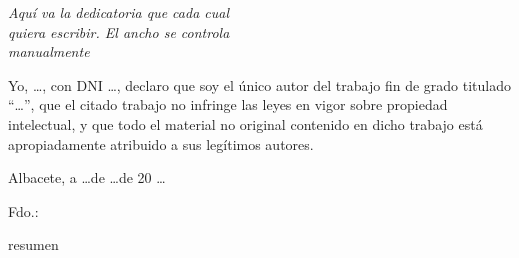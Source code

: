 %
% 



\clearpage
\thispagestyle{empty}

\vspace*{9cm}  
\begin{flushright} \em 
Aquí va la dedicatoria que cada cual \\ 
quiera escribir. El ancho se controla \\ 
manualmente
\end{flushright}


\clearpage
\thispagestyle{plain}
\setcounter{page}{1} \null
\begin{center}
\Large{}
\end{center}
\vskip1cm

Yo, \quad \ldots \quad, con DNI \quad \ldots \quad, declaro que soy el único autor del trabajo fin de grado titulado ``\quad \ldots \quad'', que el citado trabajo no infringe las leyes en vigor sobre propiedad intelectual, y que todo el material no original contenido en dicho trabajo está apropiadamente atribuido a sus legítimos autores.

\vspace*{2cm}
\begin{center}
Albacete, a \quad \ldots \quad de \quad \ldots \quad de 20 \ldots

\vskip3cm

Fdo.: \autor
\end{center}


\clearpage
\thispagestyle{plain}
\begin{center}
\Large{}
\end{center}
\vskip1cm

resumen

\clearpage
\thispagestyle{plain}
\begin{center}
\Large{}
\end{center}
\vskip1cm

\lipsum[1]